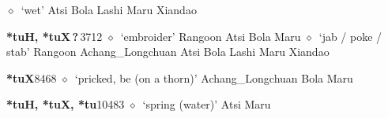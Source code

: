 \begin{list}{}{\leftmargin=1.5em \itemindent=-1.5em}
         $\diamond$~`wet'
         Atsi 
\hspace{1ex}
         Bola 
\hspace{1ex}
         Lashi 
\hspace{1ex}
         Maru 
\hspace{1ex}
         Xiandao 
  \item {\footnotesize \textbf{*tuH, *tuX\,?\,}}{\tiny 3712}
\hspace{1ex}
         $\diamond$~`embroider'
         Rangoon 
\hspace{1ex}
         Atsi 
\hspace{1ex}
         Bola 
\hspace{1ex}
         Maru 
\hspace{1ex}
         $\diamond$~`jab / poke / stab'
         Rangoon 
\hspace{1ex}
         Achang\_Longchuan 
\hspace{1ex}
         Atsi 
\hspace{1ex}
         Bola 
\hspace{1ex}
         Lashi 
\hspace{1ex}
         Maru 
\hspace{1ex}
         Xiandao 
  \item {\footnotesize \textbf{*tuX}}{\tiny 8468}
\hspace{1ex}
         $\diamond$~`pricked, be (on a thorn)'
         Achang\_Longchuan 
\hspace{1ex}
         Bola 
\hspace{1ex}
         Maru 
  \item {\footnotesize \textbf{*tuH, *tuX, *tu}}{\tiny 10483}
\hspace{1ex}
         $\diamond$~`spring (water)'
         Atsi 
\hspace{1ex}
         Maru 

\end{list}
